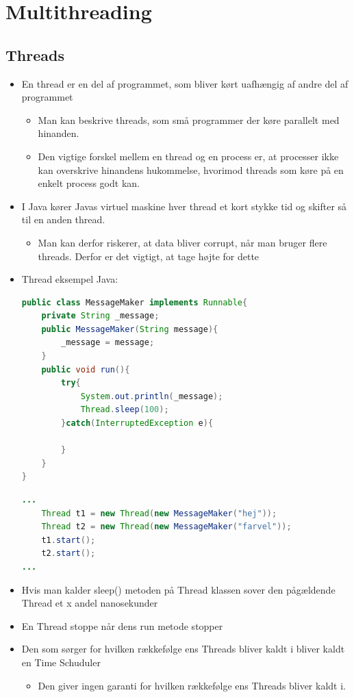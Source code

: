 \documentclass{article}
\begin{document}
\section{Multithreading}
\subsection{Threads}
\begin{itemize}
	\item En thread er en del af programmet, som bliver kørt uafhængig af andre del af programmet
	\begin{itemize}
		\item Man kan beskrive threads, som små programmer der køre parallelt med hinanden. 
		\item Den vigtige forskel mellem en thread og en process er, at processer ikke kan overskrive hinandens hukommelse, hvorimod threads som køre på en enkelt process godt kan. 
	\end{itemize}
	\item I Java kører Javas virtuel maskine hver thread et kort stykke tid og skifter så til en anden thread.
	\begin{itemize}
		\item Man kan derfor riskerer, at data bliver corrupt, når man bruger flere threads. Derfor er det vigtigt, at tage højte for dette
	\end{itemize}
	\item Thread eksempel Java:
\begin{lstlisting}[language=java]
public class MessageMaker implements Runnable{
	private String _message;
	public MessageMaker(String message){
		_message = message;
	}
	public void run(){
		try{
			System.out.println(_message);
			Thread.sleep(100);
		}catch(InterruptedException e){
		
		}  
	}
}
\end{lstlisting} 

\begin{lstlisting}[language=java]
...
	Thread t1 = new Thread(new MessageMaker("hej"));
	Thread t2 = new Thread(new MessageMaker("farvel"));
	t1.start();
	t2.start();
...
\end{lstlisting}
	\item Hvis man kalder sleep() metoden på Thread klassen sover den pågældende Thread et x andel nanosekunder
	\item En Thread stoppe når dens run metode stopper
	\item Den som sørger for hvilken rækkefølge ens Threads bliver kaldt i bliver kaldt en Time Schuduler 
	\begin{itemize}
		\item Den giver ingen garanti for hvilken rækkefølge ens Threads bliver kaldt i. 
	\end{itemize}
\end{itemize}
\end{document}
